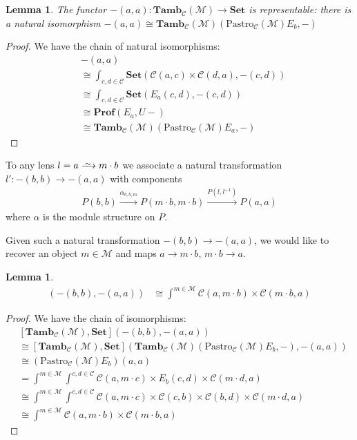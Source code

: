 \documentclass[11pt,a4paper]{amsart}
\theoremstyle{plain}
\newtheorem{lemma}[theorem]{Lemma}
\theoremstyle{definition}
\newcommand{\C}{\mathscr{C}}
\newcommand{\M}{\mathscr{M}}
\newcommand{\Pastro}{\mathrm{Pastro}}
\newcommand{\Set}{\mathbf{Set}}
\newcommand{\Prof}{\mathbf{Prof}}
\newcommand{\Tamb}{\mathbf{Tamb}}
\newcommand{\isoto}{\xrightarrow{
   \,\smash{\raisebox{-0.65ex}{\ensuremath{\scriptstyle\sim}}}\,}}
\begin{document}
\begin{lemma}
The functor $-(a, a) : \Tamb_\C(\M) \to \Set$ is representable: there is a natural isomorphism
$-(a, a) \cong \Tamb_\C(\M)(\Pastro_\C(\M)E_b, -)$
\end{lemma}
\begin{proof}
We have the chain of natural isomorphisms:
\begin{align*}
&-(a,a) \\
&\cong \int_{c,d \in \C} \Set(\C(a, c) \times \C(d, a), -(c,d)) \\
&\cong \int_{c,d \in \C} \Set(E_a(c,d), -(c,d)) \\
&\cong \Prof(E_a, U-) \\
&\cong \Tamb_\C(\M)(\Pastro_\C(\M)E_a, -)
\end{align*}
\end{proof}

To any lens $l = a \isoto m \cdot b$ we associate a natural transformation $l' : -(b, b) \to -(a, a)$ with components 
\begin{align*}
P(b, b) \xrightarrow{\alpha_{b,b,m}} P(m\cdot b, m\cdot b) \xrightarrow{P(l, l^{-1})} P(a,a)
\end{align*}
where $\alpha$ is the module structure on $P$.

Given such a natural transformation $-(b, b) \to -(a, a)$, we would like to recover an object $m \in \M$ and maps $a \to m\cdot b$, $m \cdot b \to a$. 

\begin{lemma}
\begin{align*}
[\Tamb_\C(\M), \Set](-(b, b),-(a, a)) &\cong \int^{m \in \M} \C(a, m \cdot b) \times \C(m \cdot b, a)
\end{align*}
\label{pastro-exchange-characterisation}
\end{lemma}
\begin{proof}
We have the chain of isomorphisms:
\begin{align*}
&[\Tamb_\C(\M), \Set](-(b, b),-(a, a)) \\
&\cong [\Tamb_\C(\M), \Set](\Tamb_\C(\M)(\Pastro_\C(\M)E_b, -), -(a, a)) \\
&\cong (\Pastro_\C(\M)E_b)(a,a) \\
&= \int^{m \in \M} \int^{c,d \in \C} \C(a, m \cdot c) \times E_b(c,d) \times \C(m \cdot d, a) \\
&\cong \int^{m \in \M} \int^{c,d \in \C} \C(a, m \cdot c) \times \C(c,b) \times \C(b, d) \times \C(m \cdot d, a) \\
&\cong \int^{m \in \M} \C(a, m \cdot b) \times \C(m \cdot b, a)
\end{align*}
\end{proof}
\end{document}
